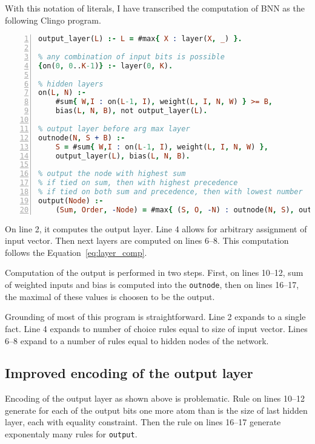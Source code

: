 \documentclass[
    digital,
    color,
    oneside,
    sansbold,
    lot,
    nolof
]{fithesis}
\begin{document}
With this notation of literals, I have transcribed the computation of BNN
as the following Clingo program.

\begin{lstlisting}[language=prolog, numbers=left, countblanklines=false]
% output layer
output_layer(L) :- L = #max{ X : layer(X, _) }.

% any combination of input bits is possible
{on(0, 0..K-1)} :- layer(0, K).

% hidden layers
on(L, N) :-
    #sum{ W,I : on(L-1, I), weight(L, I, N, W) } >= B,
    bias(L, N, B), not output_layer(L).

% output layer before arg max layer
outnode(N, S + B) :-
    S = #sum{ W,I : on(L-1, I), weight(L, I, N, W) },
    output_layer(L), bias(L, N, B).

% output the node with highest sum
% if tied on sum, then with highest precedence
% if tied on both sum and precedence, then with lowest number
output(Node) :-
    (Sum, Order, -Node) = #max{ (S, O, -N) : outnode(N, S), outpre(N, O) }.
\end{lstlisting}

On line 2, it computes the output layer. Line 4 allows for arbitrary assignment
of input vector. Then next layers are computed on lines 6--8. This computation
follows the Equation~\ref{eq:layer_comp}.

Computation of the output is performed in two steps. First, on lines 10--12,
sum of weighted inputs and bias is computed into the \texttt{outnode}, then
on lines 16--17, the maximal of these values is choosen to be the output.

Grounding of most of this program is straightforward. Line 2 expands to
a single fact. Line 4 expands to number of choice rules equal to size of input
vector. Lines 6--8 expand to a number of rules equal to hidden nodes of the
network.

\subsection{Improved encoding of the output layer}

Encoding of the output layer as shown above is problematic. Rule
on lines 10--12 generate for each of the output bits one more atom than is
the size of last hidden layer, each with equality constraint. Then the rule
on lines 16--17 generate %
exponentaly many rules for \texttt{output}.
\end{document}
